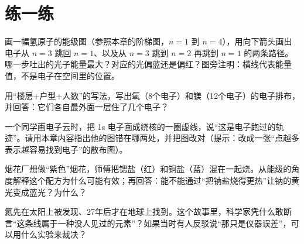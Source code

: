 \section*{练一练}

\begin{sikaoti}
\item 画一幅氢原子的能级图（参照本章的阶梯图，$n=1$ 到 $n=4$），用向下箭头画出电子从 $n=3$ 跳回 $n=1$、以及从 $n=3$ 跳到 $n=2$ 再跳到 $n=1$ 的两条路径。哪一步吐出的光子能量最大？对应的光偏蓝还是偏红？图旁注明：横线代表能量值，不是电子在空间里的位置。
\item 用“楼层+户型+人数”的写法，写出氧（8个电子）和镁（12个电子）的电子排布，并回答：它们各自最外面一层住了几个电子？
\item 一个同学画电子云时，把 1s 电子画成绕核的一圈虚线，说“这是电子跑过的轨迹”。请用本章内容指出他的图错在哪两处，并把图改对（提示：改成一张“点越多表示越容易找到电子”的散布图）。
\item 烟花厂想做“紫色”烟花，师傅把锶盐（红）和铜盐（蓝）混在一起烧。从能级的角度解释这个配方为什么可能有效；再回答：能不能通过“把钠盐烧得更热”让钠的黄光变成蓝光？为什么？
\item 氦先在太阳上被发现、27年后才在地球上找到。这个故事里，科学家凭什么敢断言“这条线属于一种没人见过的元素”？如果当时有人反驳说“那只是仪器误差”，可以用什么实验来裁决？
\end{sikaoti}
